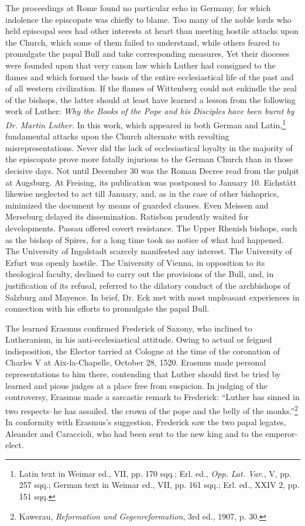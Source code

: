 The proceedings at Rome found no particular echo in Germany,
for which indolence the episcopate was chiefly to blame. Too many
of the noble lords who held episcopal sees had other interests at heart
than meeting hostile attacks upon the Church, which some of them
failed to understand, while others feared to promulgate the papal
Bull and take corresponding measures, Yet their dioceses were
founded upon that very canon law which Luther had consigned to
the flames and which formed the basis of the entire ecclesiastical life
of the past and of all western civilization. If the flames of Wittenberg
could not enkindle the zeal of the bishops, the latter should at
least have learned a lesson from the following work of Luther: \textit{Why
the Books of the Pope and his Disciples have been burnt by Dr. Martin Luther.}
In this work, which appeared in both German and
Latin,\footnote{Latin text in Weimar ed., VII, pp. 170 sqq.; Erl. ed., \textit{Opp. Lat. Var.}, V, pp. 257 sqq.;
German text in Weimar ed., VII, pp. 161 sqq.; Erl. ed., XXIV 2, pp. 151 sqq.}
fundamental attacks upon the Church alternate with revolting
misrepresentations. Never did the lack of ecclesiastical loyalty
in the majority of the episcopate prove more fatally injurious to
the German Church than in those decisive days. Not until December
30 was the Roman Decree read from the pulpit at Augsburg. At
Freising, its publication was postponed to January 10. Eichstätt likewise
neglected to act till January, and, as in the case of other bishoprics,
minimized the document by means of guarded clauses. Even
Meissen and Merseburg delayed its dissemination. Ratisbon prudently
waited for developments. Passau offered covert resistance. The Upper
Rhenish bishops, such as the bishop of Spires, for a long time took no
notice of what had happened. The University of Ingolstadt scarcely
manifested any interest. The University of Erfurt was openly hostile.
The University of Vienna, in opposition to its theological faculty, declined
to carry out the provisions of the Bull, and, in justification of
its refusal, referred to the dilatory conduct of the archbishops of
Salzburg and Mayence. In brief, Dr. Eck met with most unpleasant
experiences in connection with his efforts to promulgate the papal
Bull.

The learned Erasmus confirmed Frederick of Saxony, who inclined
to Lutheranism, in his anti-ecclesiastical attitude. Owing to actual or
feigned indisposition, the Elector tarried at Cologne at the time of
the coronation of Charles V at Aix-la-Chapelle, October 28, 1520.
Erasmus made personal representations to him there, contending that
Luther should first be tried by learned and pious judges at a place free
from suspicion. In judging of the controversy, Erasmus made a sarcastic
remark to Frederick: “Luther has sinned in two respects--he
has assailed. the crown of the pope and the belly of the monks.”\footnote
{Kawerau, \textit{Reformation und Gegenreformation}, 3rd ed., 1907, p. 30.}
In conformity with Erasmus’s suggestion, Frederick saw the two
papal legates, Aleander and Caraccioli, who had been sent to the new
king and to the emperor-elect.

